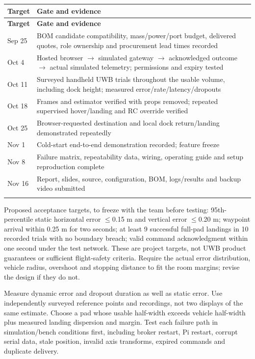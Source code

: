 \documentclass[10pt,letterpaper]{article}
\begin{document}
\begingroup\small\begin{longtable}{P{1.764in}P{5.020in}}
\toprule{}\textbf{Target} & \textbf{Gate and evidence} \\\midrule\endfirsthead
\toprule{}\textbf{Target} & \textbf{Gate and evidence} \\\midrule\endhead
\bottomrule\endfoot
Sep 25 & BOM candidate compatibility, mass/power/port budget, delivered quotes, role ownership and procurement lead times recorded \\ \addlinespace[2pt]
Oct 4 & Hosted browser $\rightarrow$ simulated gateway $\rightarrow$ acknowledged outcome $\rightarrow$ actual simulated telemetry; permissions and expiry tested \\ \addlinespace[2pt]
Oct 11 & Surveyed handheld UWB trials throughout the usable volume, including dock height; measured error/rate/latency/dropouts \\ \addlinespace[2pt]
Oct 18 & Frames and estimator verified with props removed; repeated supervised hover/landing and RC override verified \\ \addlinespace[2pt]
Oct 25 & Browser-requested destination and local dock return/landing demonstrated repeatedly \\ \addlinespace[2pt]
Nov 1 & Cold-start end-to-end demonstration recorded; feature freeze \\ \addlinespace[2pt]
Nov 8 & Failure matrix, repeatability data, wiring, operating guide and setup reproduction complete \\ \addlinespace[2pt]
Nov 16 & Report, slides, source, configuration, BOM, logs/results and backup video submitted \\ \addlinespace[2pt]
\end{longtable}\endgroup
Proposed acceptance targets, to freeze with the team before testing: 95th-percentile static horizontal error $\leq$0.15 m and vertical error $\leq$0.20 m; waypoint arrival within 0.25 m for two seconds; at least 9 successful full-pad landings in 10 recorded trials with no boundary breach; valid command acknowledgment within one second under the test network. These are project targets, not UWB product guarantees or sufficient flight-safety criteria. Require the actual error distribution, vehicle radius, overshoot and stopping distance to fit the room margins; revise the design if they do not.

Measure dynamic error and dropout duration as well as static error. Use independently surveyed reference points and recordings, not two displays of the same estimate. Choose a pad whose usable half-width exceeds vehicle half-width plus measured landing dispersion and margin. Test each failure path in simulation/bench conditions first, including broker restart, Pi restart, corrupt serial data, stale position, invalid axis transforms, expired commands and duplicate delivery.
\end{document}
